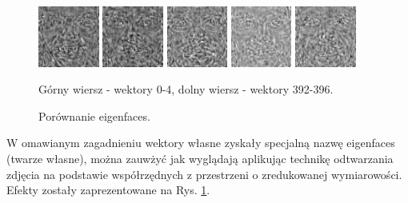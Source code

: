 \documentclass[oneside, eng]{mgr}
\begin{document}
\begin{figure}
	\begin{minipage}{2cm}
		\includegraphics[width=2cm]{392.jpg}
	\end{minipage}
	\begin{minipage}{2cm}
		\includegraphics[width=2cm]{393.jpg}
	\end{minipage}
	\begin{minipage}{2cm}
		\includegraphics[width=2cm]{394.jpg}
	\end{minipage}
	\begin{minipage}{2cm}
		\includegraphics[width=2cm]{395.jpg}
	\end{minipage}
	\begin{minipage}{2cm}
		\includegraphics[width=2cm]{396.jpg}
	\end{minipage}
	
	\caption{Porównanie eigenfaces.}
Górny wiersz - wektory 0-4, dolny wiersz - wektory 392-396.
	\label{fig:eigenfaces}
\end{figure}

W omawianym zagadnieniu wektory własne zyskały specjalną nazwę eigenfaces (twarze własne), można zauwżyć jak wyglądają aplikując technikę odtwarzania zdjęcia na podstawie współrzędnych z przestrzeni o zredukowanej wymiarowości. Efekty zostały zaprezentowane na Rys. \ref{fig:eigenfaces}. 
\end{document}

